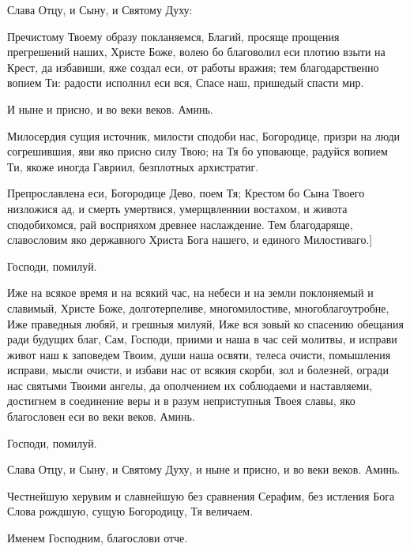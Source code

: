 \begin{mymulticols}
Слава Отцу, и Сыну, и Святому Духу: 



Пречистому Твоему образу покланяемся, Благий, просяще прощения прегрешений наших, Христе Боже, волею бо благоволил еси плотию взыти на Крест, да избавиши, яже создал еси, от работы вражия; тем благодарственно вопием Ти: радости исполнил еси вся, Спасе наш, пришедый спасти мир.



И ныне и присно, и во веки веков. Аминь.


Милосердия сущия источник, милости сподоби нас, Богородице, призри на люди согрешившия, яви яко присно силу Твою; на Тя бо уповающе, радуйся вопием Ти, якоже иногда Гавриил, безплотных архистратиг.


Препрославлена еси, Богородице Дево, поем Тя; Крестом бо Сына Твоего низложися ад, и смерть умертвися, умерщвленнии востахом, и живота сподобихомся, рай восприяхом древнее наслаждение. Тем благодаряще, славословим яко державного Христа Бога нашего, и единого Милостиваго.]





Господи, помилуй.

Иже на всякое время и на всякий час, на небеси и на земли поклоняемый и славимый, Христе Боже, долготерпеливе, многомилостиве, многоблагоутробне, Иже праведныя любяй, и грешныя милуяй, Иже вся зовый ко спасению обещания ради будущих благ, Сам, Господи, приими и наша в час сей молитвы, и исправи живот наш к заповедем Твоим, души наша освяти, телеса очисти, помышления исправи, мысли очисти, и избави нас от всякия скорби, зол и болезней, огради нас святыми Твоими ангелы, да ополчением их соблюдаеми и наставляеми, достигнем в соединение веры и в разум неприступныя Твоея славы, яко благословен еси во веки веков. Аминь.





Господи, помилуй.

Слава Отцу, и Сыну, и Святому Духу, и ныне и присно, и во веки веков. Аминь.

Честнейшую херувим и славнейшую без сравнения Серафим, без истления Бога Слова рождшую, сущую Богородицу, Тя величаем.

Именем Господним, благослови отче.


\end{mymulticols}
